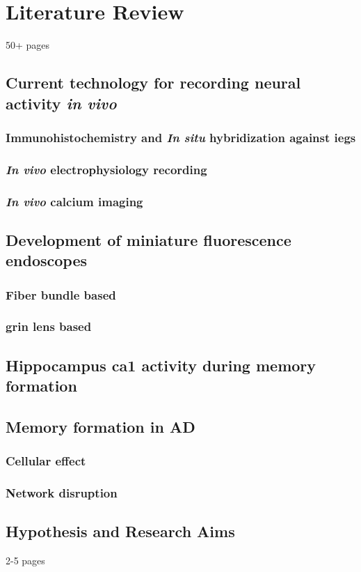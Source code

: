 \chapter{Literature Review}
50+ pages

\section{Current technology for recording neural activity \textit{in vivo}}
\subsection{Immunohistochemistry and \textit{In situ} hybridization against \glspl{ieg}}
\subsection{\textit{In vivo} electrophysiology recording}
\subsection{\textit{In vivo} calcium imaging}

\section{Development of miniature fluorescence endoscopes}
\subsection{Fiber bundle based}
\subsection{\gls{grin} lens based}

\section{Hippocampus \gls{ca1} activity during memory formation}

\section{Memory formation in \gls{AD}}
\subsection{Cellular effect}
\subsection{Network disruption}

\section{Hypothesis and Research Aims}
2-5 pages
